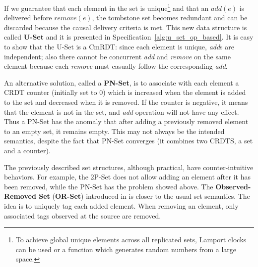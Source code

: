 If we guarantee that each element in the set is unique\footnote{To achieve
global unique elements across all replicated sets, Lamport clocks can be used or
a function which generates random numbers from a large space.} and that an
$\textit{add}(e)$ is delivered before $\textit{remove}(e)$, the tombstone set
becomes redundant and can be discarded because the causal delivery criteria
is met. This new data structure is called \textbf{U-Set} and it is presented in
Specification~\ref{alg:u_set_op_based}. It is easy to show that the U-Set is a
CmRDT: since each element is unique, \textit{add}s are independent; also there
cannot be concurrent \textit{add} and \textit{remove} on the same element
because each \textit{remove} must casually follow the corresponding
\textit{add}.

An alternative solution, called a \textbf{PN-Set}, is to associate with each
element a CRDT counter (initially set to 0) which is increased when the element
is added to the set and decreased when it is removed. If the counter is
negative, it means that the element is not in the set, and \textit{add}
operation will not have any effect. Thus a PN-Set has the anomaly that after
adding a previously removed element to an empty set, it remains empty. This may
not always be the intended semantics, despite the fact that PN-Set converges (it
combines two CRDTS, a set and a counter).

The previously described set structures, although practical, have
counter-intuitive behaviors. For example, the 2P-Set does not allow adding an
element after it has been removed, while the PN-Set has the problem showed
above. The \textbf{Observed-Removed Set} (\textbf{OR-Set}) introduced in
\cite{preguica:inria-00445758} is closer to the usual set semantics. The idea is
to uniquely tag each added element. When removing an element, only associated
tags observed at the source are removed.


